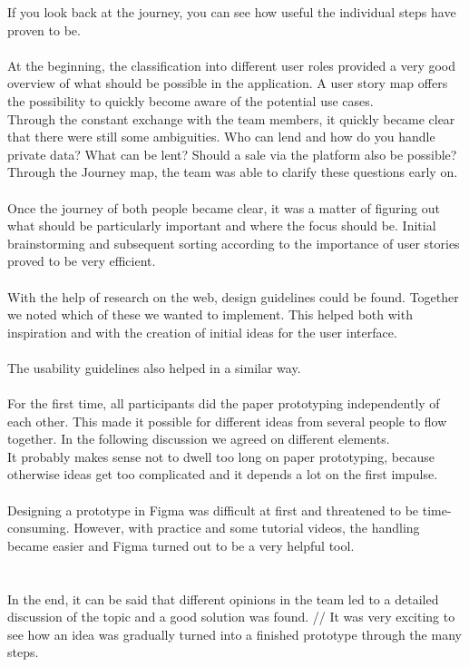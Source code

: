 If you look back at the journey, you can see how useful the individual steps have proven to be.\\
\\
At the beginning, the classification into different user roles provided a very good overview of what should be possible in the application. A user story map offers the possibility to quickly become aware of the potential use cases. \\
Through the constant exchange with the team members, it quickly became clear that there were still some ambiguities. Who can lend and how do you handle private data? What can be lent? Should a sale via the platform also be possible? \\
Through the Journey map, the team was able to clarify these questions early on.\\
\\
Once the journey of both people became clear, it was a matter of figuring out what should be particularly important and where the focus should be. Initial brainstorming and subsequent sorting according to the importance of user stories proved to be very efficient.\\
\\
With the help of research on the web, design guidelines could be found. Together we noted which of these we wanted to implement. This helped both with inspiration and with the creation of initial ideas for the user interface.\\
\\
The usability guidelines also helped in a similar way.\\
\\
For the first time, all participants did the paper prototyping independently of each other. This made it possible for different ideas from several people to flow together. In the following discussion we agreed on different elements. \\
It probably makes sense not to dwell too long on paper prototyping, because otherwise ideas get too complicated and it depends a lot on the first impulse.\\
\\
Designing a prototype in Figma was difficult at first and threatened to be time-consuming. However, with practice and some tutorial videos, the handling became easier and Figma turned out to be a very helpful tool.\\
\\
\\
In the end, it can be said that different opinions in the team led to a detailed discussion of the topic and a good solution was found. //
It was very exciting to see how an idea was gradually turned into a finished prototype through the many steps.




